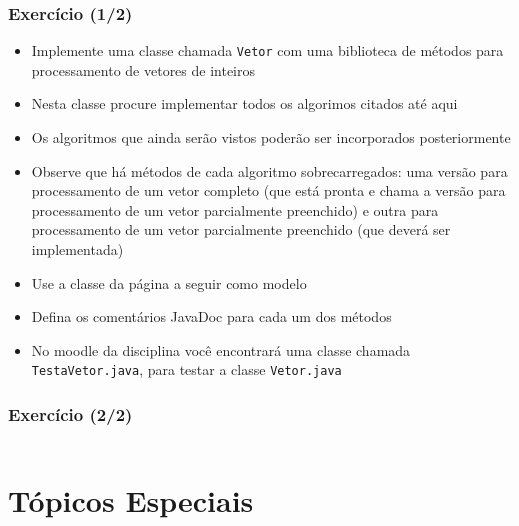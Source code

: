 \documentclass[xcolor={dvipsnames,table},aspectratio=169]{beamer}
\begin{document}
\begin{frame}[fragile]\frametitle{Exercício (1/2)}
\begin{itemize}
	\item Implemente uma classe chamada \texttt{Vetor} com uma biblioteca de métodos para processamento de vetores de inteiros
	\item Nesta classe procure implementar todos os algorimos citados até aqui
	\item Os algoritmos que ainda serão vistos poderão ser incorporados posteriormente
	\item Observe que há métodos de cada algoritmo sobrecarregados: uma versão para processamento de um vetor completo (que está pronta e chama a versão para processamento de um vetor parcialmente preenchido) e outra para processamento de um vetor parcialmente preenchido (que deverá ser implementada)
	\item Use a classe da página a seguir como modelo
	\item Defina os comentários JavaDoc para cada um dos métodos
	\item No moodle da disciplina você encontrará uma classe chamada \texttt{TestaVetor.java}, para testar a classe \texttt{Vetor.java}
\end{itemize}
\end{frame}

\begin{frame}[fragile]\frametitle{Exercício (2/2)}
\tiny{\inputminted[bgcolor=cyan!10]{java}{src/Vetor.java}}
\end{frame}

\section{Tópicos Especiais}
\end{document}

